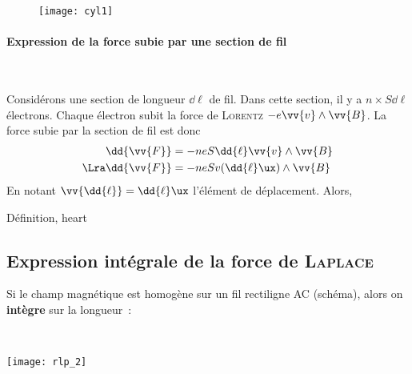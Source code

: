 \documentclass[../main/main.tex]{subfiles}
\begin{document}
\begin{figure}[h]
	\centering
	\texttt{[image: cyl1]}
	\label{fig:cyl1}
\end{figure}

\paragraph*{Expression de la force subie par une section de fil}~
\begin{hide}
	Considérons une section de longueur $\dd{\ell}$ de fil. Dans cette section, il y a
	$n\times S \dd{\ell}$ électrons. Chaque électron subit la force de
	\textsc{Lorentz} $-e \vv{v} \wedge \vv{B}$. La force subie par la section de fil
	est donc
	\begin{align*}
		\dd{\vv{F}} & = -neS \dd{\ell}\vv{v}\wedge \vv{B}
		\\\Lra
		\dd{\vv{F}} & = -neSv (\dd{\ell}\ux)\wedge \vv{B}
	\end{align*}
	En notant $\vv{\dd{\ell}} = \dd{\ell}\ux$ l'élément de déplacement. Alors,
\end{hide}
\begin{tdefi}{Définition, heart}
\end{tdefi}

\subsection{Expression intégrale de la force de \textsc{Laplace}}
\label{ssec:lplint}
Si le champ magnétique est homogène sur un fil rectiligne AC (schéma), alors on
\textbf{intègre} sur la longueur~:
\smallbreak
\noindent
\begin{minipage}[t]{.5\linewidth}
\end{minipage}
\hfill
\begin{minipage}[t]{.5\linewidth}
	~
	\begin{center}
		\texttt{[image: rlp\_2]}
		\label{fig:rlp_2}
	\end{center}
\end{minipage}
\end{document}
